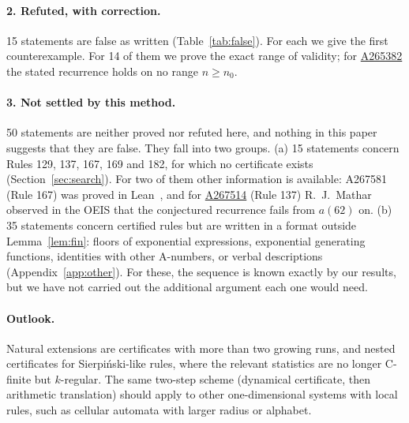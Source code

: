 \documentclass[11pt]{article}
\theoremstyle{definition}
\theoremstyle{remark}
\newcommand{\oeis}[1]{\href{https://oeis.org/#1}{#1}}
\begin{document}
\paragraph{2. Refuted, with correction.} 15 statements are false as written (Table~\ref{tab:false}). For each we give the first counterexample. For 14 of them we prove the exact range of validity; for \oeis{A265382} the stated recurrence holds on no range $n\ge n_0$.

\paragraph{3. Not settled by this method.} 50 statements are neither proved nor refuted here, and nothing in this paper suggests that they are false. They fall into two groups. (a) 15 statements concern Rules 129, 137, 167, 169 and 182, for which no certificate exists (Section~\ref{sec:search}). For two of them other information is available: A267581 (Rule 167) was proved in Lean~\cite{adamczewski}, and for \oeis{A267514} (Rule 137) R.~J.~Mathar observed in the OEIS that the conjectured recurrence fails from $a(62)$ on. (b) 35 statements concern certified rules but are written in a format outside Lemma~\ref{lem:fin}: floors of exponential expressions, exponential generating functions, identities with other A-numbers, or verbal descriptions (Appendix~\ref{app:other}). For these, the sequence is known exactly by our results, but we have not carried out the additional argument each one would need.

\paragraph{Outlook.} Natural extensions are certificates with more than two growing runs, and nested certificates for Sierpi\'nski-like rules, where the relevant statistics are no longer C-finite but $k$-regular. The same two-step scheme (dynamical certificate, then arithmetic translation) should apply to other one-dimensional systems with local rules, such as cellular automata with larger radius or alphabet.
\end{document}
